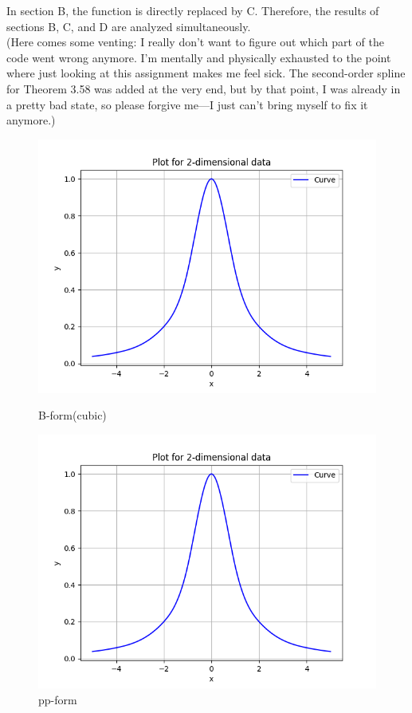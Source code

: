 \documentclass[a4paper]{article}
\begin{document}
In section B, the function is directly replaced by C. Therefore, the results of sections B, C, and D are analyzed simultaneously.\\
({\scriptsize Here comes some venting: I really don’t want to figure out which part of the code went wrong anymore. I’m mentally and physically exhausted to the point where just looking at this assignment makes me feel sick. The second-order spline for Theorem 3.58 was added at the very end, but by that point, I was already in a pretty bad state, so please forgive me—I just can’t bring myself to fix it anymore.})
\begin{figure}[h!]
    \centering
    \begin{minipage}{0.45\textwidth}
        \centering
        \includegraphics[width=\linewidth]{../figure/C_357.png}
        \caption{B-form(cubic)}
    \end{minipage}%
    \hfill
    \begin{minipage}{0.45\textwidth}
        \centering
        \includegraphics[width=\linewidth]{../figure/C_pp.png}
        \caption{pp-form}
    \end{minipage}
\end{figure}
\end{document}
